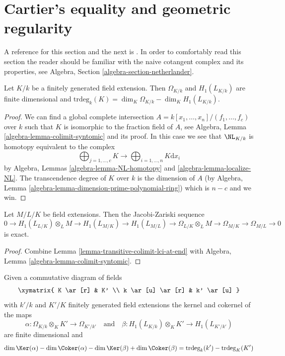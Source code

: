 \section{Cartier's equality and geometric regularity}
\label{section-cartier-equality}

\noindent
A reference for this section and the next is \cite[Section 39]{MatCA}.
In order to comfortably read this section the reader should be
familiar with the naive cotangent complex and its properties, see
Algebra, Section \ref{algebra-section-netherlander}.

\begin{lemma}
\label{lemma-cartier-equality}
Let $K/k$ be a finitely generated field extension.
Then $\Omega_{K/k}$ and $H_1(L_{K/k})$ are finite dimensional and
$\text{trdeg}_k(K) = \dim_K \Omega_{K/k} - \dim_K H_1(L_{K/k})$.
\end{lemma}

\begin{proof}
We can find a global complete intersection
$A = k[x_1, \ldots, x_n]/(f_1, \ldots, f_c)$
over $k$ such that
$K$ is isomorphic to the fraction field of $A$, see
Algebra, Lemma \ref{algebra-lemma-colimit-syntomic}
and its proof. In this case we see that $\NL_{K/k}$ is homotopy
equivalent to the complex
$$
\bigoplus\nolimits_{j = 1, \ldots, c} K \longrightarrow
\bigoplus\nolimits_{i = 1, \ldots, n} K\text{d}x_i
$$
by Algebra, Lemmas \ref{algebra-lemma-NL-homotopy} and
\ref{algebra-lemma-localize-NL}.
The transcendence degree of $K$ over $k$ is the dimension of $A$
(by Algebra, Lemma \ref{algebra-lemma-dimension-prime-polynomial-ring})
which is $n - c$ and we win.
\end{proof}

\begin{lemma}
\label{lemma-transitivity-gamma}
Let $M/L/K$ be field extensions. Then the Jacobi-Zariski
sequence
$$
0 \to H_1(L_{L/K}) \otimes_L M \to
H_1(L_{M/K}) \to
H_1(L_{M/L}) \to
\Omega_{L/K} \otimes_L M \to
\Omega_{M/K} \to
\Omega_{M/L} \to 0
$$
is exact.
\end{lemma}

\begin{proof}
Combine
Lemma \ref{lemma-transitive-colimit-lci-at-end}
with
Algebra, Lemma \ref{algebra-lemma-colimit-syntomic}.
\end{proof}

\begin{lemma}
\label{lemma-gamma-commutative-diagram}
Given a commutative diagram of fields
$$
\xymatrix{
K \ar[r] & K' \\
k \ar[u] \ar[r] & k' \ar[u]
}
$$
with $k'/k$ and $K'/K$ finitely generated field extensions
the kernel and cokernel of the maps
$$
\alpha : \Omega_{K/k} \otimes_K K' \to \Omega_{K'/k'}
\quad\text{and}\quad
\beta : H_1(L_{K/k}) \otimes_K K' \to H_1(L_{K'/k'})
$$
are finite dimensional and
$$
\dim \Ker(\alpha) - \dim \Coker(\alpha)
-\dim \Ker(\beta) + \dim \Coker(\beta)
=
\text{trdeg}_k(k') - \text{trdeg}_K(K')
$$
\end{lemma}

